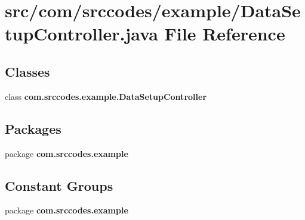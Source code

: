 \section{src/com/srccodes/example/\-Data\-Setup\-Controller.java File Reference}
\label{_data_setup_controller_8java}
\subsection*{Classes}
\begin{DoxyCompactItemize}
\item 
class {\bf com.\-srccodes.\-example.\-Data\-Setup\-Controller}
\end{DoxyCompactItemize}
\subsection*{Packages}
\begin{DoxyCompactItemize}
\item 
package {\bf com.\-srccodes.\-example}
\end{DoxyCompactItemize}
\subsection*{Constant Groups}
\begin{DoxyCompactItemize}
\item 
package {\bf com.\-srccodes.\-example}
\end{DoxyCompactItemize}
